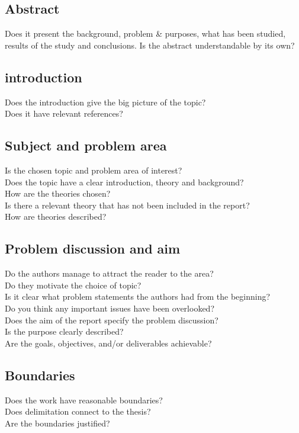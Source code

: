 \documentclass[11pt,a4paper]{article}
\begin{document}
\subsection*{Abstract}
Does it present the background, problem \& purposes, what has been studied, results of the 
study and conclusions. Is the abstract understandable by its own?

\subsection*{introduction}
Does the introduction give the big picture of the topic?\\
Does it have relevant references?

\subsection*{Subject and problem area}
Is the chosen topic and problem area of interest?\\
Does the topic have a clear introduction, theory and background?\\
How are the theories chosen?\\
Is there a relevant theory that has not been included in the report?\\
How are theories described?

\subsection*{Problem discussion and aim}
Do the authors manage to attract the reader to the area?\\
Do they motivate the choice of topic?\\
Is it clear what problem statements the authors had from the beginning?\\
Do you think any important issues have been overlooked?\\
Does the aim of the report specify the problem discussion? \\
Is the purpose clearly described?\\
Are the goals, objectives, and/or deliverables achievable?

\subsection*{Boundaries}
Does the work have reasonable boundaries? \\
Does delimitation connect to the thesis?\\
Are the boundaries justified?
\end{document}
